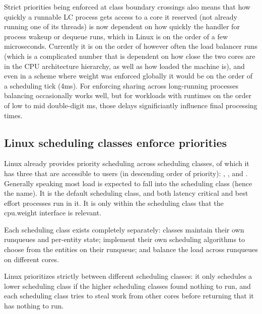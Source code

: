 Strict priorities being enforced at class boundary crossings also means that how
quickly a runnable LC process gets access to a core it reserved (not already
running one of its threads) is now dependent on how quickly the handler for
process wakeup or dequeue runs, which in Linux is on the order of a few
microseconds. Currently it is on the order of however often the load balancer
runs (which is a complicated number that is dependent on how close the two cores
are in the CPU architecture hierarchy, as well as how loaded the machine is),
and even in a scheme where weight was enforced globally it would be on the order
of a scheduling tick (4ms). For enforcing sharing across long-running processes
balancing occasionally works well, but for workloads with runtimes on the order
of low to mid double-digit ms, those delays significiantly influence final
processing times.


\subsection{Linux scheduling classes enforce
priorities}\label{ss:approach:linux-classes-isolate}

Linux already provides priority scheduling across scheduling classes, of which
it has three that are accessible to users (in descending order of priority):
\deadlineclass{}, \rtclass{}, and \normalclass{}. Generally speaking most load
is expected to fall into the \normalclass{} scheduling class (hence the name).
It is the default scheduling class, and both latency critical and best effort
processes run in it. It is only within the \normalclass{} scheduling class that
the \cgroups{} cpu.weight interface is relevant.

Each scheduling class exists completely separately: classes maintain their own
runqueues and per-entity state; implement their own scheduling algorithms to
choose from the entities on their runqueue; and balance the load across
runqueues on different cores. 

Linux prioritizes strictly between different scheduling classes: it only
schedules a lower scheduling class if the higher scheduling classes found
nothing to run, and each scheduling class tries to steal work from other cores
before returning that it has nothing to run.

